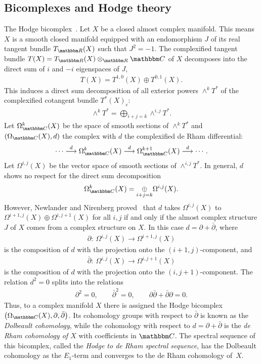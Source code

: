 \documentclass[10pt,a4paper]{amsart}
\theoremstyle{definition}
\numberwithin{equation}{section}
\def\C{{\mathbbm C}}
\def\R{{\mathbbm R}}
\def\lra{{\longrightarrow}}
\newcommand{\oplusop}[1]{{\mathop{\oplus}\limits_{#1}}}
\begin{document}
\subsection{Bicomplexes and Hodge theory}
The Hodge bicomplex~\cite{DGMS, GH, W}.
Let $X$ be a closed almost complex manifold. This means $X$ is a smooth closed manifold equipped with an endomorphism $J$ of its real tangent bundle $T_\R(X)$ such that $J^2=-1$.
The complexified tangent bundle $T(X)=T_\R(X)\otimes_{\R}\C$ of
$X$ decomposes into the direct sum of $i$ and $-i$ eigenspaces of $J$,
\begin{gather*} T(X) = T^{1,0}(X) \oplus T^{0,1}(X).\end{gather*}
This induces a direct sum decomposition of all exterior powers $\wedge ^kT^{\ast}$
of the complexified cotangent bundle $T^{\ast}(X)_c$:
\begin{gather*} \wedge^kT^{\ast} = \bigoplus_{i+j=k} \wedge^{i,j}T^{\ast} .\end{gather*}
Let $\Omega_{\C}^k(X)$ be the space of smooth sections of $\wedge^kT^{\ast}$
and $(\Omega_{\C}(X),d)$ the complex with $d$ the complexified de Rham differential:
\begin{gather*}\cdots \stackrel{d}{\lra} \Omega_{\C}^k(X) \stackrel{d}{\lra} \Omega_{\C}^{k+1}(X)
\stackrel{d}{\lra}\cdots. \end{gather*}
Let $\Omega^{i,j}(X)$ be the vector space of smooth sections of
$\wedge^{i,j}T^{\ast}$.
In general, $d$ shows no respect for the direct sum decomposition
\begin{gather*} \Omega_{\C}^k(X) = \oplusop{i+j=k} \Omega^{i,j}(X).\end{gather*}
However, Newlander and Nirenberg proved~\cite{NN} that $d$ takes
$\Omega^{i,j}(X)$ to $\Omega^{i+1,j}(X)\oplus \Omega^{i,j+1}(X)$
for all $i,j$ if and only if the almost complex structure $J$ of $X$ comes from a
complex structure on $X$. In this case $d= \partial + \bar{\partial}$, where
\begin{gather*} \partial \colon \  \Omega^{i,j}(X) \lra \Omega^{i+1,j}(X)\end{gather*}
is the composition of $d$ with the projection onto the $(i+1,j)$-component,
and
\begin{gather*} \bar{\partial} \colon \ \Omega^{i,j}(X) \lra \Omega^{i,j+1}(X)\end{gather*}
is the composition of $d$ with the projection onto the $(i,j+1)$-component.
The relation $d^2=0$ splits into the relations
\begin{gather*} \partial^2=0, \qquad \bar{\partial}^2=0, \qquad
\partial \bar{\partial} + \bar{\partial} \partial =0.\end{gather*}
Thus, to a complex manifold $X$ there is assigned
the Hodge bicomplex $\big(\Omega_{\C}(X), \partial, \bar{\partial}\big)$.
Its cohomology groups with respect to $\bar{\partial}$ is known as
the \emph{Dolbeault cohomology}, while the cohomology with respect to
$d= \partial + \bar{\partial}$ is the \emph{de Rham cohomology of $X$}
with coefficients in $\C$. The spectral sequence of this bicomplex,
called the \emph{Hodge to de Rham spectral sequence},
has the Dolbeault cohomology as the $E_1$-term and converges to
the de Rham cohomology of~$X$.
\end{document}
